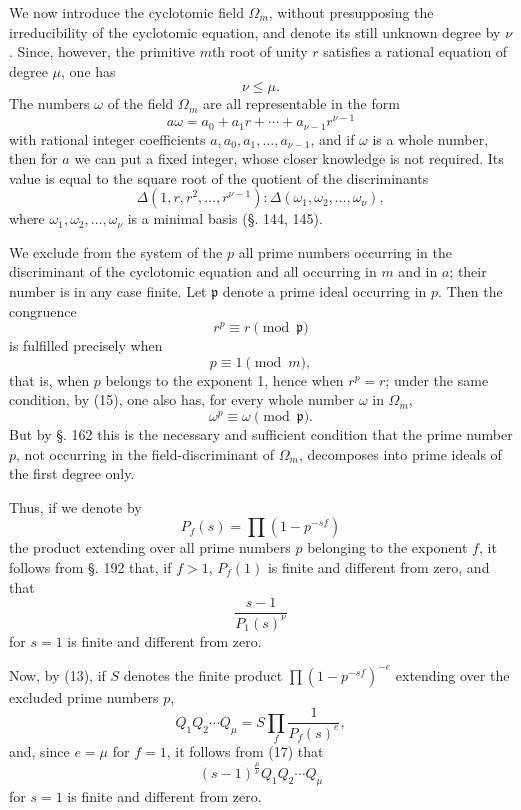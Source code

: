 \documentclass[11pt]{article}
\begin{document}
We now introduce the cyclotomic field $\Omega_m$, without presupposing the irreducibility of the cyclotomic equation, and denote its still unknown degree by $\nu$. Since, however, the primitive $m$th root of unity $r$ satisfies a rational equation of degree $\mu$, one has
\begin{equation}\tag{14}
\nu\leq\mu.
\end{equation}
The numbers $\omega$ of the field $\Omega_m$ are all representable in the form
\begin{equation}\tag{15}
a\omega=a_0+a_1r+\cdots+a_{\nu-1}r^{\nu-1}
\end{equation}
with rational integer coefficients $a,a_0,a_1,\ldots,a_{\nu-1}$,
and if $\omega$ is a whole number, then for $a$ we can put a fixed integer, whose closer knowledge is not required. Its value is equal to the square root of the quotient of the discriminants
\[
\Delta(1,r,r^2,\ldots,r^{\nu-1}):\Delta(\omega_1,\omega_2,\ldots,\omega_\nu),
\]
where $\omega_1,\omega_2,\ldots,\omega_\nu$ is a minimal basis (§. 144, 145).

We exclude from the system of the $p$ all prime numbers occurring in the discriminant of the cyclotomic equation and all occurring in $m$ and in $a$; their number is in any case finite. Let $\mathfrak p$ denote a prime ideal occurring in $p$. Then the congruence
\[
r^p\equiv r \pmod{\mathfrak p}
\]
is fulfilled precisely when
\begin{equation}\tag{16}
p\equiv1 \pmod m,
\end{equation}
that is, when $p$ belongs to the exponent 1, hence when $r^p=r$; under the same condition, by (15), one also has, for every whole number $\omega$ in $\Omega_m$,
\[
\omega^p\equiv\omega \pmod{\mathfrak p}.
\]
But by §. 162 this is the necessary and sufficient condition that the prime number $p$, not occurring in the field-discriminant of $\Omega_m$, decomposes into prime ideals of the first degree only.

Thus, if we denote by
\[
P_f(s)=\prod (1-p^{-sf})
\]
the product extending over all prime numbers $p$ belonging to the exponent $f$, it follows from §. 192 that, if $f>1$, $P_f(1)$ is finite and different from zero, and that
\begin{equation}\tag{17}
\frac{s-1}{P_1(s)^\nu}
\end{equation}
for $s=1$ is finite and different from zero.

Now, by (13), if $S$ denotes the finite product $\prod(1-p^{-sf})^{-e}$ extending over the excluded prime numbers $p$,
\[
Q_1Q_2\cdots Q_\mu=S\prod_f\frac{1}{P_f(s)^e},
\]
and, since $e=\mu$ for $f=1$, it follows from (17) that
\begin{equation}\tag{18}
(s-1)^{\frac{\mu}{\nu}}Q_1Q_2\cdots Q_\mu
\end{equation}
for $s=1$ is finite and different from zero.
\end{document}
